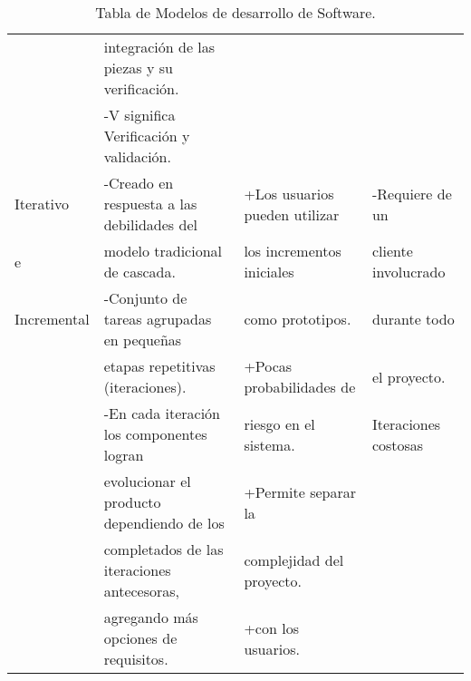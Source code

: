 \begin{table}[ht]
\begin{center}
\begin{tabular}{|l|l|l|l|}
    					& integración de las piezas y su verificación. 		&  								&						\\	
    					& -V significa Verificación y validación.				&  								&					\\	
    	\hline
    	Iterativo		& -Creado en respuesta a las debilidades del			&+Los usuarios pueden utilizar &-Requiere de un	\\
    	e				&modelo tradicional de cascada. 						&los incrementos iniciales		&cliente involucrado  	\\	
    	Incremental		& -Conjunto de tareas agrupadas en pequeñas  			&como prototipos.  				&durante todo \\	
    					&etapas repetitivas (iteraciones).						&+Pocas probabilidades de 		&el proyecto.			\\
						& -En cada iteración los componentes logran 			&riesgo en el sistema.			&Iteraciones costosas    	\\
  						&evolucionar el producto dependiendo de los			&+Permite separar la			&    	\\    
    					& completados de las iteraciones antecesoras,			&complejidad del proyecto.		&    	\\
    					& agregando más opciones de requisitos.  				&+con los usuarios.				&    	\\
    	\hline
    	\end{tabular}
  		\hspace*{-4cm}
	\caption{Tabla de Modelos de desarrollo de Software.}
	\label{Tabla de Modelos de desarrollo de Software.}
	\end{center}
\end{table}

\newpage

